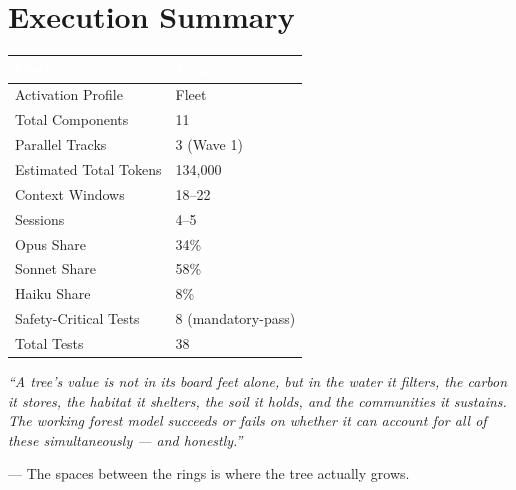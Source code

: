 \documentclass[11pt,letterpaper]{article}
\newcommand{\tableheader}[1]{\textbf{\sffamily\textcolor{white}{#1}}}
\begin{document}
\section{Execution Summary}

\begin{center}
\begin{tabularx}{\textwidth}{L{5cm}X}
\toprule
{}
\tableheader{Metric} & \tableheader{Value} \\
\midrule
Activation Profile & Fleet \\
Total Components & 11 \\
Parallel Tracks & 3 (Wave 1) \\
Estimated Total Tokens & 134,000 \\
Context Windows & 18--22 \\
Sessions & 4--5 \\
Opus Share & 34\% \\
Sonnet Share & 58\% \\
Haiku Share & 8\% \\
Safety-Critical Tests & 8 (mandatory-pass) \\
Total Tests & 38 \\
\bottomrule
\end{tabularx}
\end{center}

\vspace{1cm}

\begin{quotebox}
\textit{``A tree's value is not in its board feet alone, but in the water it filters, the carbon it stores, the habitat it shelters, the soil it holds, and the communities it sustains. The working forest model succeeds or fails on whether it can account for all of these simultaneously --- and honestly.''}

\vspace{0.5em}

\hfill --- The spaces between the rings is where the tree actually grows.
\end{quotebox}
\end{document}
